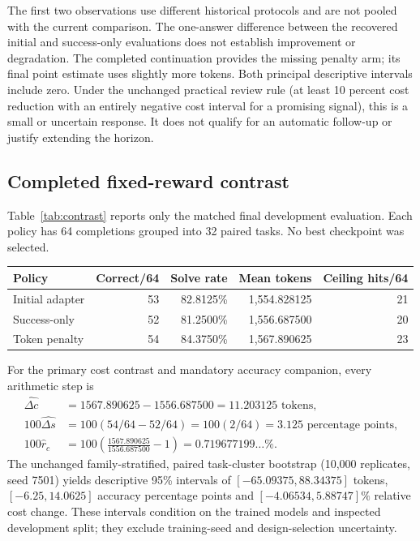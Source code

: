 \documentclass[11pt]{article}
\begin{document}
The first two observations use different historical protocols and are not pooled with the current comparison. The one-answer difference between the recovered initial and success-only evaluations does not establish improvement or degradation. The completed continuation provides the missing penalty arm; its final point estimate uses slightly more tokens. Both principal descriptive intervals include zero. Under the unchanged practical review rule (at least 10 percent cost reduction with an entirely negative cost interval for a promising signal), this is a small or uncertain response. It does not qualify for an automatic follow-up or justify extending the horizon.

\subsection{Completed fixed-reward contrast}

Table~\ref{tab:contrast} reports only the matched final development evaluation. Each policy has 64 completions grouped into 32 paired tasks. No best checkpoint was selected.
\begin{center}
\begin{tabular}{lrrrr}
\toprule
Policy & Correct/64 & Solve rate & Mean tokens & Ceiling hits/64 \\
\midrule
Initial adapter & 53 & 82.8125\% & 1,554.828125 & 21 \\
Success-only & 52 & 81.2500\% & 1,556.687500 & 20 \\
Token penalty & 54 & 84.3750\% & 1,567.890625 & 23 \\
\bottomrule
\end{tabular}
\label{tab:contrast}
\end{center}
For the primary cost contrast and mandatory accuracy companion, every arithmetic step is
\begin{align}
\widehat{\Delta c}&=1567.890625-1556.687500=11.203125\text{ tokens},\\
100\widehat{\Delta s}&=100(54/64-52/64)=100(2/64)=3.125\text{ percentage points},\\
100\widehat r_c&=100\left(\frac{1567.890625}{1556.687500}-1\right)
=0.719677199\ldots\%.
\end{align}
The unchanged family-stratified, paired task-cluster bootstrap (10,000 replicates, seed 7501) yields descriptive 95\% intervals of $[-65.09375,88.34375]$ tokens, $[-6.25,14.0625]$ accuracy percentage points and $[-4.06534,5.88747]\%$ relative cost change. These intervals condition on the trained models and inspected development split; they exclude training-seed and design-selection uncertainty.
\end{document}

